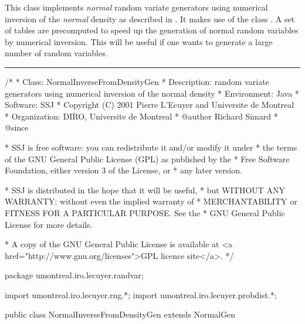 
This class implements \emph{normal} random variate generators
 using numerical inversion of the \emph{normal} density
 as described in \cite{rDER10a}.  It makes use of the class
.
A set of tables are precomputed to speed up the generation of normal random 
variables by numerical inversion. This will be useful if one 
wants to generate a large number of random variables.


\bigskip\hrule

\begin{code}
\begin{hide}
/*
 * Class:        NormalInverseFromDensityGen
 * Description:  random variate generators using numerical inversion of
                 the normal density
 * Environment:  Java
 * Software:     SSJ 
 * Copyright (C) 2001  Pierre L'Ecuyer and Universite de Montreal
 * Organization: DIRO, Universite de Montreal
 * @author       Richard Simard
 * @since

 * SSJ is free software: you can redistribute it and/or modify it under
 * the terms of the GNU General Public License (GPL) as published by the
 * Free Software Foundation, either version 3 of the License, or
 * any later version.

 * SSJ is distributed in the hope that it will be useful,
 * but WITHOUT ANY WARRANTY; without even the implied warranty of
 * MERCHANTABILITY or FITNESS FOR A PARTICULAR PURPOSE.  See the
 * GNU General Public License for more details.

 * A copy of the GNU General Public License is available at
   <a href="http://www.gnu.org/licenses">GPL licence site</a>.
 */
\end{hide}
package umontreal.iro.lecuyer.randvar;\begin{hide}
import umontreal.iro.lecuyer.rng.*;
import umontreal.iro.lecuyer.probdist.*;
\end{hide}

public class NormalInverseFromDensityGen extends NormalGen \begin{hide} {

\end{hide}\end{code}

